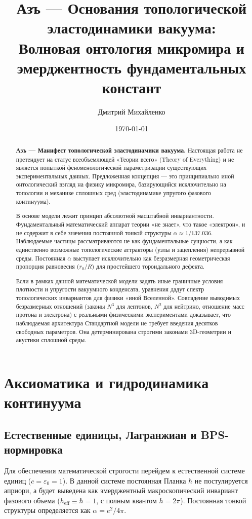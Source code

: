\documentclass[12pt,a4paper]{article}
\title{\textbf{Азъ — Основания топологической эластодинамики вакуума:\\ Волновая онтология микромира и эмерджентность фундаментальных констант}}
\author{Дмитрий Михайленко}
\date{\today}
\begin{document}
	
	\maketitle

\begin{abstract}
\textbf{Азъ — Манифест топологической эластодинамики вакуума.} 
Настоящая работа не претендует на статус всеобъемлющей «Теории всего» (Theory of Everything) и не является попыткой феноменологической параметризации существующих экспериментальных данных. Предложенная концепция — это принципиально иной онтологический взгляд на физику микромира, базирующийся исключительно на топологии и механике сплошных сред (эластодинамике упругого фазового континуума).

В основе модели лежит принцип абсолютной масштабной инвариантности. Фундаментальный математический аппарат теории «не знает», что такое «электрон», и не содержит в себе значения постоянной тонкой структуры $\alpha \approx 1/137.036$. Наблюдаемые частицы рассматриваются не как фундаментальные сущности, а как единственно возможные топологические аттракторы (узлы и зацепления) непрерывной среды. Постоянная $\alpha$ выступает исключительно как безразмерная геометрическая пропорция равновесия ($r_0/R$) для простейшего тороидального дефекта. 

Если в рамках данной математической модели задать иные граничные условия плотности и упругости вакуумного конденсата, уравнения дадут спектр топологических инвариантов для физики «иной Вселенной». Совпадение выводимых безразмерных отношений (законы $N^3$ для лептонов, $N^2$ для нейтрино, отношение масс протона и электрона) с реальными физическими экспериментами доказывает, что наблюдаемая архитектура Стандартной модели не требует введения десятков свободных параметров. Она детерминирована строгими законами 3D-геометрии и акустики сплошной среды.
\end{abstract}

\section{Аксиоматика и гидродинамика континуума}

\subsection{Естественные единицы, Лагранжиан и BPS-нормировка}
Для обеспечения математической строгости перейдем к естественной системе единиц ($c = \varepsilon_0 = 1$). В данной системе постоянная Планка $\hbar$ не постулируется априори, а будет выведена как эмерджентный макроскопический инвариант фазового объема ($h_{\text{eff}} \equiv \hbar = 1$, с полным квантом $h = 2\pi$). Постоянная тонкой структуры определяется как $\alpha = e^2 / 4\pi$.
\end{document}
